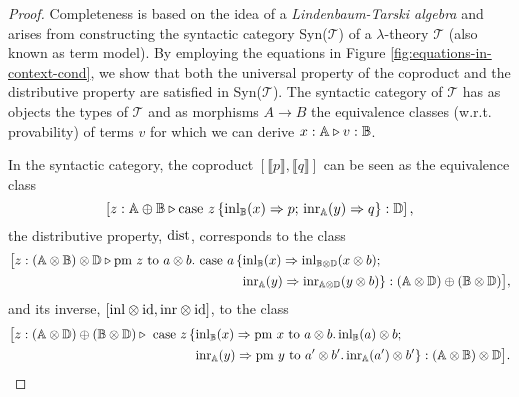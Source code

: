 \documentclass[10pt,a4paper]{amsart}
\theoremstyle{definition}
\theoremstyle{definition}
\theoremstyle{definition}
\theoremstyle{definition}
\theoremstyle{definition}
\theoremstyle{definition}
\begin{document}
\begin{proof}
  Completeness is based on the idea of a \textit{Lindenbaum-Tarski algebra} and arises from constructing the syntactic category Syn($\mathscr{T}$) of a $\lambda$-theory $\mathscr{T}$ (also known as term model). By employing the equations in Figure \ref{fig:equations-in-context-cond}, we show that both the universal property of the coproduct and the distributive property are satisfied in Syn($\mathscr{T}$). The syntactic category of $\mathscr{T}$ has as objects the types of $\mathscr{T}$ and as morphisms $A \rightarrow B$ the equivalence classes (w.r.t. provability) of terms $v$ for which we can derive $x : \mathbb{A} \triangleright v : \mathbb{B}$.

  In the syntactic category, the coproduct $[\llbracket p \rrbracket, \llbracket q \rrbracket]$ can be seen as the equivalence
  class 
  $$\left[z:\mathbb{A} \oplus\mathbb{B} \triangleright \text{case } z\,\{\mathrm{inl}_{\mathbb{B}}(x) \Rightarrow p ; \, \mathrm{inr}_{\mathbb{A}}(y) \Rightarrow q\}: \mathbb{D}\right],$$ 
  the distributive property, $\mathrm{dist}$, corresponds to the class 
  \begin{align*}
    \big[z:(\mathbb{A} \otimes \mathbb{\mathbb{B}}) \otimes \mathbb{\mathbb{D}} \triangleright \text{pm } z \text{ to } a \otimes b. \text{ case } a\,\{ &\mathrm{inl}_{\mathbb{B}}(x) \Rightarrow \mathrm{inl}_{\mathbb{B} \otimes \mathbb{D}}(x \otimes b); \\
    & \mathrm{inr}_{\mathbb{A}}(y) \Rightarrow \mathrm{inr}_{\mathbb{A} \otimes \mathbb{D}} (y \otimes b)\}: (\mathbb{A} \otimes \mathbb{D}) \oplus (\mathbb{B} \otimes \mathbb{D})\big],
  \end{align*}
and its inverse, $[\mathrm{inl} \otimes \mathrm{id}, \mathrm{inr} \otimes \mathrm{id}]$, to the class
\begin{align*}
  \big[z: (\mathbb{A} \otimes \mathbb{D}) \oplus (\mathbb{B} \otimes \mathbb{D}) \triangleright  \text{ case } z \,\{ &\mathrm{inl}_{\mathbb{B}}(x) \Rightarrow \text{pm } x \text{ to } a \otimes b. \, \mathrm{inl}_{\mathbb{B}}(a) \otimes b; \\
  & \mathrm{inr}_{\mathbb{A}}(y) \Rightarrow \text{pm } y \text{ to } a' \otimes b'. \, \mathrm{inr}_{\mathbb{A}}(a') \otimes b'\}: (\mathbb{A} \otimes \mathbb{\mathbb{B}}) \otimes \mathbb{\mathbb{D}}\big].
\end{align*}



\end{proof}
\end{document}
